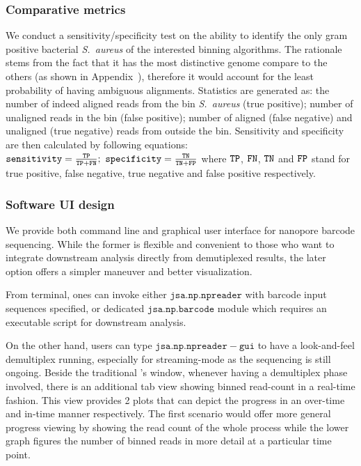 \subsubsection{Comparative metrics}
We conduct a sensitivity/specificity test on the ability to identify the only gram positive bacterial \emph{S.~aureus} of the interested binning algorithms. The rationale stems from the fact that it has the most distinctive genome compare to the others (as shown in Appendix~), therefore it would account for the least probability of having ambiguous alignments. Statistics are generated as: the number of indeed aligned reads from the bin \emph{S.~aureus} (true positive); number of unaligned reads in the bin (false positive); number of aligned (false negative) and unaligned (true negative) reads from outside the bin. Sensitivity and specificity are then calculated by following equations:
$
	\mathtt{sensitivity} = \frac{\mathtt{TP}}{\mathtt{TP+FN}} ;~
    \mathtt{specificity} = \frac{\mathtt{TN}}{\mathtt{TN+FP}}
$
where $\mathtt{TP}$, $\mathtt{FN}$, $\mathtt{TN}$ and $\mathtt{FP}$ stand for true positive, false negative, true negative and false positive respectively.

\subsubsection{Software UI design}
We provide both command line and graphical user interface for nanopore barcode sequencing. While the former is flexible and convenient to those who want to integrate downstream analysis directly from demutiplexed results, the later option offers a simpler maneuver and better visualization.

From terminal, ones can invoke either $\mathtt{jsa.np.npreader}$ with barcode input sequences specified, or dedicated $\mathtt{jsa.np.barcode}$ module which requires an executable script for downstream analysis. 

On the other hand, users can type $\mathtt{jsa.np.npreader -gui}$ to have a look-and-feel demultiplex running, especially for streaming-mode as the sequencing is still ongoing.
Beside the traditional \npreader{}'s window, whenever having a demultiplex phase involved, there is an additional tab view showing binned read-count in a real-time fashion. This view provides 2 plots that can depict the progress in an over-time and in-time manner respectively. The first scenario would offer more general progress viewing by showing the read count of the whole process while the lower graph figures the number of binned reads in more detail at a particular time point.

